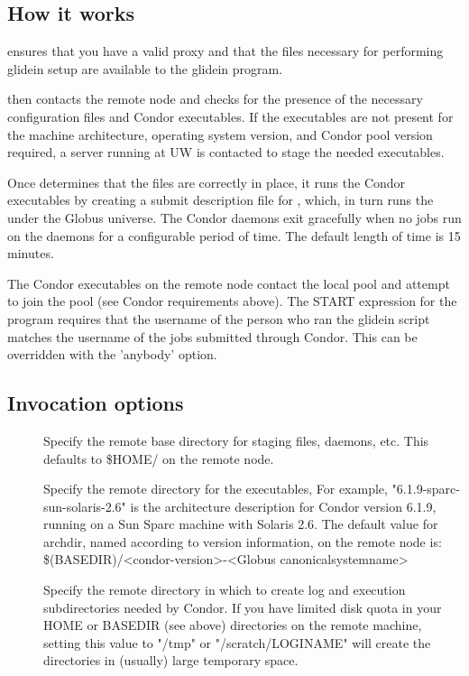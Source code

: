 \begin{enumerate}
\subsection{How it works}
 ensures that you have a valid proxy and that the files
necessary for performing glidein setup are available to the glidein
program. 

 then contacts the remote node and checks for the
presence of the necessary configuration files and Condor executables.
If the executables are not present for the machine architecture, 
operating system version, and Condor pool version required, a 
server running at UW is contacted to stage the needed executables.

Once  determines that the files are correctly in place,
it runs the Condor executables by creating a submit description file for 
, which, in turn runs the  under the Globus 
universe.
The Condor daemons exit gracefully when no jobs run on the daemons for a 
configurable period of time. The default length of time is 15 minutes.

The Condor executables on the remote node contact the local pool and
attempt to join the pool (see Condor requirements above). The START
expression for the  program requires that the username
of the person who ran the glidein script matches the username of the jobs 
submitted through Condor. This can be overridden with the 'anybody' option.

\subsection{Invocation options}
\begin{description}
\item[]
	Specify the remote base directory for staging files, daemons, etc. 
	This defaults to \$HOME/ on the remote node.

\item[]
	Specify the remote directory for the executables, 
	For example, "6.1.9-sparc-sun-solaris-2.6" is the architecture description 
	for Condor version 6.1.9, running on a Sun Sparc machine with Solaris 2.6. 
	The default value for archdir, named according to version information, on 
	the remote node is:
	\$(BASEDIR)/<condor-version>-<Globus canonicalsystemname>

\item[]
	Specify the remote directory in which to create log and execution 
	subdirectories needed by Condor. If you have limited disk quota in
	your HOME or BASEDIR (see above) directories on the remote machine,
	setting this value to "/tmp" or "/scratch/LOGINAME" will create the
	directories in (usually) large temporary space.


\end{description}
\end{enumerate}
